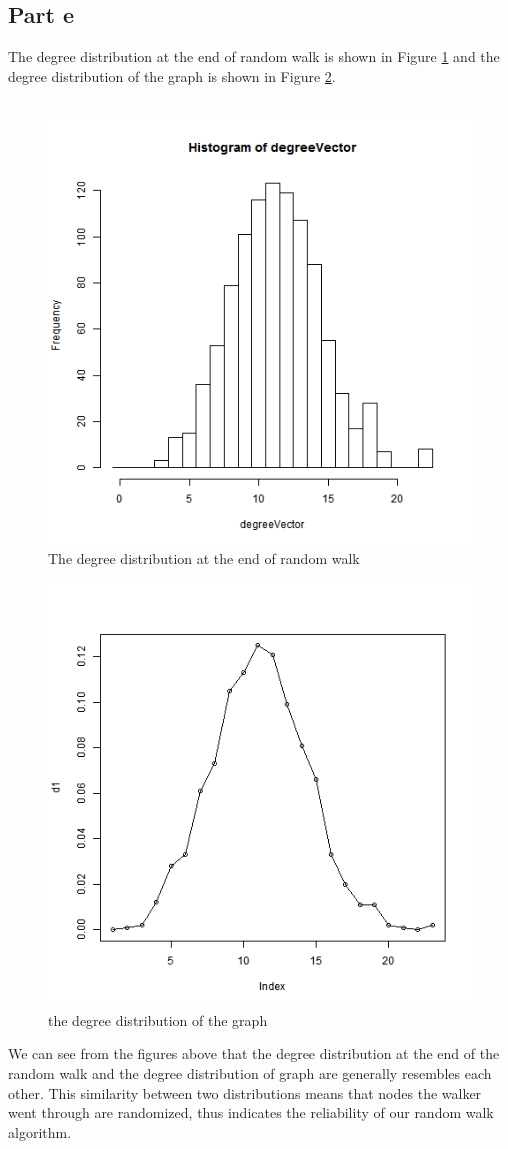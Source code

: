 \documentclass{article}
\begin{document}
\subsection{Part e}
The degree distribution at the end of random walk is shown in Figure \ref{fig:p1_e1} and the degree distribution of the graph is shown in Figure \ref{fig:p1_e2}.\\
\\

\begin{figure}[htbp]
\centering
\includegraphics[width=.6\textwidth]{Q1e.png}
\caption{The degree distribution at the end of random walk}
\label{fig:p1_e1}
\end{figure}

\begin{figure}[htbp]
\centering
\includegraphics[width=.6\textwidth]{Q1a_1.png}
\caption{the degree distribution of the graph}
\label{fig:p1_e2}
\end{figure}
\noindent We can see from the figures above that the degree distribution at the end of the random walk and the degree distribution of graph are generally resembles each other.
This similarity between two distributions means that nodes the walker went through are randomized, thus indicates the reliability of our random walk algorithm.
\end{document}
